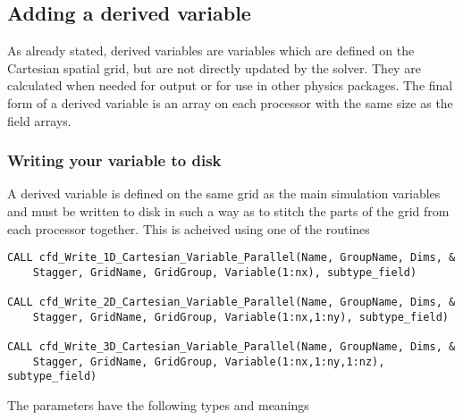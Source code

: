 \documentclass[12pt,a4paper]{article}
\newcommand{\simpleboxverbatim}{\begin{Verbatim}[obeytabs=true,frame=single,
  framerule=0.5mm,rulecolor=\color{warwickmid},formatcom=\color{black}]}
\begin{document}
\subsection{Adding a derived variable}

As already stated, derived variables are variables which are defined on the
Cartesian spatial grid, but are not directly updated by the solver. They are
calculated when needed for output or for use in other physics packages. The
final form of a derived variable is an array on each processor with the same
size as the field arrays.

\subsubsection{Writing your variable to disk}
A derived variable is defined on the same grid as the main simulation variables
and must be written to disk in such a way as to stitch the parts of the grid
from each processor together. This is acheived using one of the routines
\simpleboxverbatim
CALL cfd_Write_1D_Cartesian_Variable_Parallel(Name, GroupName, Dims, &
    Stagger, GridName, GridGroup, Variable(1:nx), subtype_field)

CALL cfd_Write_2D_Cartesian_Variable_Parallel(Name, GroupName, Dims, &
    Stagger, GridName, GridGroup, Variable(1:nx,1:ny), subtype_field)

CALL cfd_Write_3D_Cartesian_Variable_Parallel(Name, GroupName, Dims, &
    Stagger, GridName, GridGroup, Variable(1:nx,1:ny,1:nz), subtype_field)
\end{Verbatim}
The parameters have the following types and meanings
\end{document}

